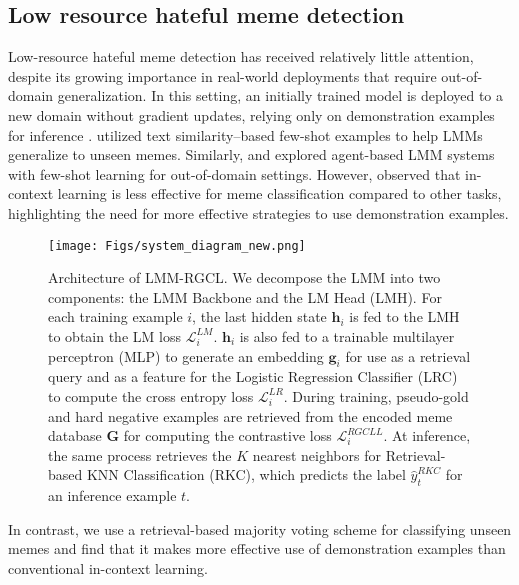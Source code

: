 \subsection{Low resource hateful meme detection} 
Low-resource hateful meme detection has received relatively little attention, despite its growing importance in real-world deployments that require out-of-domain generalization. In this setting, an initially trained model is deployed to a new domain without gradient updates, relying only on demonstration examples for inference \cite{Huang_LowResourceLMMAgentHatefulMeme_2024}.  \citet{Hee2024BridgeModality} utilized text similarity–based few-shot examples to help LMMs generalize to unseen memes. Similarly, \citet{Hu_2024_VPD} and \citet{Huang_LowResourceLMMAgentHatefulMeme_2024} explored agent-based LMM systems with few-shot learning for out-of-domain settings. However, \citet{Huang_LowResourceLMMAgentHatefulMeme_2024} observed that in-context learning is less effective for meme classification compared to other tasks, highlighting the need for more effective strategies to use demonstration examples.
\begin{figure*}[h!]
    \centering
    \texttt{[image: Figs/system\_diagram\_new.png]}
    \caption{Architecture of LMM-RGCL.
    We decompose the LMM into two components: the LMM Backbone and the LM Head (LMH). For each training example $i$, the last hidden state $\mathbf{h}_i$ is fed to the LMH to obtain the LM loss $\mathcal{L}_i^{LM}$. $\mathbf{h}_i$ is also fed to a trainable multilayer perceptron (MLP) to generate an embedding $\mathbf{g}_i$ for use as a retrieval query and as a feature for the Logistic Regression Classifier (LRC) to compute the cross entropy loss $\mathcal{L}_i^{LR}$. During training, pseudo-gold and hard negative examples are retrieved from the encoded meme database $\mathbf{G}$ for computing the contrastive loss $\mathcal{L}_i^{RGCLL}$. At inference, the same process retrieves the $K$ nearest neighbors for Retrieval-based KNN Classification (RKC),  which predicts the label $\hat{y}_t^{RKC}$ for an inference example $t$.}
    \label{fig:system}
\end{figure*}
In contrast, we use a retrieval-based majority voting scheme for classifying unseen memes and find that it makes more effective use of demonstration examples than conventional in-context learning.